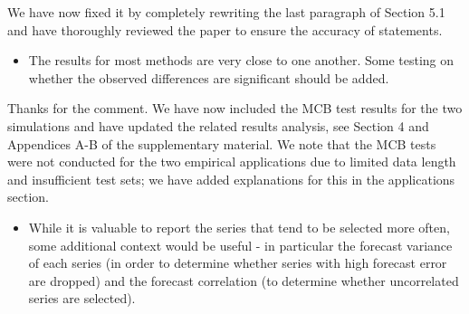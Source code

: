 \documentclass[11pt,a4paper,]{article}
\providecommand{\tightlist}{%
  \setlength{\itemsep}{0pt}\setlength{\parskip}{0pt}}
\renewenvironment{quote}
               {\list{}{\rightmargin\leftmargin}%
                \item\relax\color[RGB]{0,150,0}}
               {\endlist}
\begin{document}
\begin{quote}
We have now fixed it by completely rewriting the last paragraph of
Section 5.1 and have thoroughly reviewed the paper to ensure the
accuracy of statements.
\end{quote}

\begin{itemize}
\tightlist
\item
  The results for most methods are very close to one another. Some
  testing on whether the observed differences are significant should be
  added.
\end{itemize}

\begin{quote}
Thanks for the comment. We have now included the MCB test results for
the two simulations and have updated the related results analysis, see
Section 4 and Appendices A-B of the supplementary material. We note that
the MCB tests were not conducted for the two empirical applications due
to limited data length and insufficient test sets; we have added
explanations for this in the applications section.
\end{quote}

\begin{itemize}
\tightlist
\item
  While it is valuable to report the series that tend to be selected
  more often, some additional context would be useful - in particular
  the forecast variance of each series (in order to determine whether
  series with high forecast error are dropped) and the forecast
  correlation (to determine whether uncorrelated series are selected).
\end{itemize}
\end{document}
